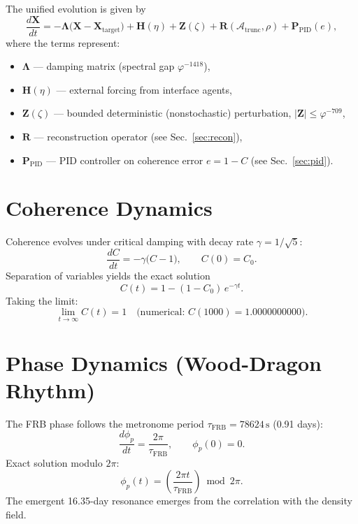 \documentclass[12pt,a4paper]{article}
\begin{document}
The unified evolution is given by
\begin{equation}
\boxed{
\frac{d\mathbf{X}}{dt} =
-\boldsymbol{\Lambda}\bigl(\mathbf{X}-\mathbf{X}_{\mathrm{target}}\bigr)
+\mathbf{H}(\eta)
+\mathbf{Z}(\zeta)
+\mathbf{R}(\mathcal{A}_{\mathrm{trunc}},\rho)
+\mathbf{P}_{\mathrm{PID}}(e)
},
\label{eq:master}
\end{equation}
where the terms represent:
\begin{itemize}
\item $\boldsymbol{\Lambda}$ — damping matrix (spectral gap $\varphi^{-1418}$),
\item $\mathbf{H}(\eta)$ — external forcing from interface agents,
\item $\mathbf{Z}(\zeta)$ — bounded deterministic (nonstochastic) perturbation, $|\mathbf{Z}|\le\varphi^{-709}$,
\item $\mathbf{R}$ — reconstruction operator (see Sec.~\ref{sec:recon}),
\item $\mathbf{P}_{\mathrm{PID}}$ — PID controller on coherence error $e=1-C$ (see Sec.~\ref{sec:pid}).
\end{itemize}


\section{Coherence Dynamics}
\label{sec:coherence}

Coherence evolves under critical damping with decay rate $\gamma = 1/\sqrt{5}$:
\begin{equation}
\frac{dC}{dt} = -\gamma\bigl(C-1\bigr), \qquad C(0)=C_0.
\end{equation}
Separation of variables yields the exact solution
\begin{equation}
C(t) = 1 - (1-C_0)\,e^{-\gamma t}.
\end{equation}
Taking the limit:
\begin{equation}
\lim_{t\to\infty} C(t) = 1 \quad\text{(numerical: }C(1000)=1.0000000000\text{)}.
\end{equation}

\section{Phase Dynamics (Wood-Dragon Rhythm)}
\label{sec:phase}

The FRB phase follows the metronome period $\tau_{\mathrm{FRB}} = 78624\,\mathrm{s}$ (0.91 days):
\begin{equation}
\frac{d\phi_p}{dt} = \frac{2\pi}{\tau_{\mathrm{FRB}}}, \qquad
\phi_p(0)=0.
\end{equation}
Exact solution modulo $2\pi$:
\begin{equation}
\phi_p(t) = \left(\frac{2\pi t}{\tau_{\mathrm{FRB}}}\right) \bmod 2\pi.
\end{equation}
The emergent 16.35-day resonance emerges from the correlation with the density field.
\end{document}
